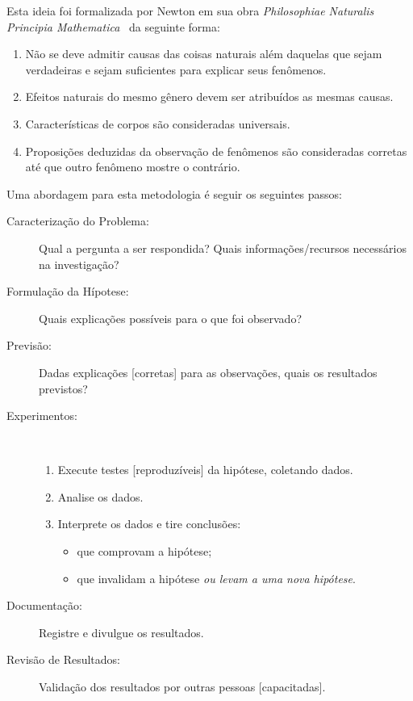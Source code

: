 Esta ideia foi formalizada por Newton em sua obra \emph{Philosophiae Naturalis
Principia Mathematica}~\cite{newton1833philosophiae} da seguinte forma:
\begin{enumerate}
	\item Não se deve admitir causas das coisas naturais além daquelas
	que sejam verdadeiras e sejam suficientes para explicar seus fenômenos.
	\item Efeitos naturais do mesmo gênero devem ser atribuídos as mesmas causas.
	\item Características de corpos são consideradas universais.
	\item Proposições deduzidas da observação de fenômenos são
	consideradas corretas até que outro fenômeno mostre o contrário.
\end{enumerate}%

Uma abordagem para esta metodologia é seguir os seguintes passos:
\begin{description}
	\item[Caracterização do Problema:] Qual a pergunta a ser respondida? Quais
informações/recursos necessários na investigação?
	\item[Formulação da Hípotese:] Quais explicações possíveis para o que foi observado?
	\item[Previsão:] Dadas explicações [corretas] para as observações, quais os
	resultados previstos?
	\item[Experimentos:] \ \\\vspace{-2em}
		\begin{enumerate}
			\item Execute testes [reproduzíveis] da hipótese, coletando dados.
			\item Analise os dados.
			\item Interprete os dados e tire conclusões:
				\begin{itemize}
				\item que comprovam a hipótese;
				\item que invalidam a hipótese \emph{ou levam a uma nova hipótese}.
				\end{itemize}
		\end{enumerate}
	\item[Documentação:] Registre e divulgue os resultados.
	\item[Revisão de Resultados:] Validação dos resultados por outras pessoas
	[capacitadas].
\end{description}%

